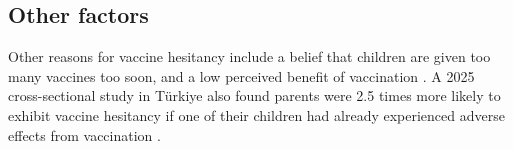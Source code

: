 \documentclass{article}
\begin{document}
\subsection{Other factors}
Other reasons for vaccine hesitancy include a belief that children are given too many vaccines too soon, and a low perceived benefit of vaccination \cite{novilla2023parents}. A 2025 cross-sectional study in Türkiye also found parents were 2.5 times more likely to exhibit vaccine hesitancy if one of their children had already experienced adverse effects from vaccination \cite{komurluouglu2025vaccine}.

\printbibliography
\end{document}
